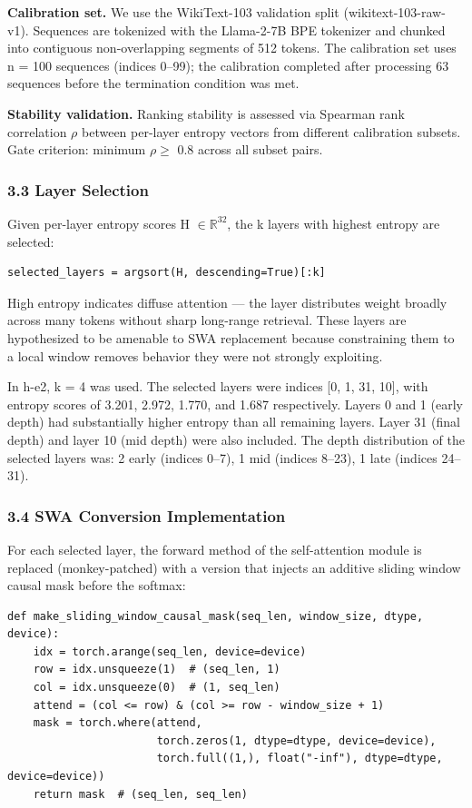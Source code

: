 \textbf{Calibration set.} We use the WikiText-103 validation split (wikitext-103-raw-v1). Sequences are tokenized with the Llama-2-7B BPE tokenizer and chunked into contiguous non-overlapping segments of 512 tokens. The calibration set uses n = 100 sequences (indices 0--99); the calibration completed after processing 63 sequences before the termination condition was met.

\textbf{Stability validation.} Ranking stability is assessed via Spearman rank correlation $\rho$ between per-layer entropy vectors from different calibration subsets. Gate criterion: minimum $\rho \geq$ 0.8 across all subset pairs.

\subsubsection{3.3 Layer Selection}

Given per-layer entropy scores H $\in \mathbb{R}^{32}$, the k layers with highest entropy are selected:

\begin{verbatim}
selected_layers = argsort(H, descending=True)[:k]
\end{verbatim}

High entropy indicates diffuse attention --- the layer distributes weight broadly across many tokens without sharp long-range retrieval. These layers are hypothesized to be amenable to SWA replacement because constraining them to a local window removes behavior they were not strongly exploiting.

In h-e2, k = 4 was used. The selected layers were indices [0, 1, 31, 10], with entropy scores of 3.201, 2.972, 1.770, and 1.687 respectively. Layers 0 and 1 (early depth) had substantially higher entropy than all remaining layers. Layer 31 (final depth) and layer 10 (mid depth) were also included. The depth distribution of the selected layers was: 2 early (indices 0--7), 1 mid (indices 8--23), 1 late (indices 24--31).

\subsubsection{3.4 SWA Conversion Implementation}

For each selected layer, the forward method of the self-attention module is replaced (monkey-patched) with a version that injects an additive sliding window causal mask before the softmax:

\begin{verbatim}
def make_sliding_window_causal_mask(seq_len, window_size, dtype, device):
    idx = torch.arange(seq_len, device=device)
    row = idx.unsqueeze(1)  # (seq_len, 1)
    col = idx.unsqueeze(0)  # (1, seq_len)
    attend = (col <= row) & (col >= row - window_size + 1)
    mask = torch.where(attend,
                       torch.zeros(1, dtype=dtype, device=device),
                       torch.full((1,), float("-inf"), dtype=dtype, device=device))
    return mask  # (seq_len, seq_len)
\end{verbatim}

